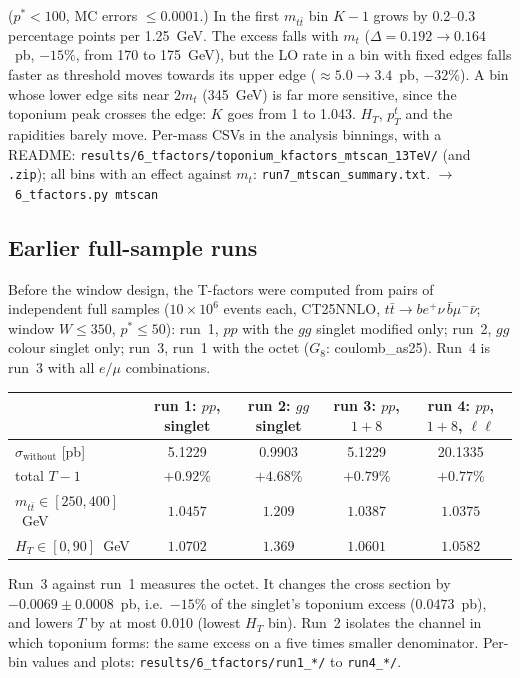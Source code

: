 \documentclass[11pt]{article}
\newcommand{\code}[1]{\texttt{#1}}
\newcommand{\fn}[1]{\hfill$\to$~\code{#1}}
\begin{document}
($p^*<100$, MC errors $\le0.0001$.) In the first $m_{t\bar t}$ bin $K-1$ grows by 0.2--0.3 percentage points per 1.25~GeV. The
excess falls with $m_t$ ($\Delta=0.192\to0.164$~pb, $-15\%$, from 170 to 175~GeV), but the LO rate in a bin with fixed edges
falls faster as threshold moves towards its upper edge ($\approx5.0\to3.4$~pb, $-32\%$). A bin whose lower edge sits near $2m_t$
(345~GeV) is far more sensitive, since the toponium peak crosses the edge: $K$ goes from 1 to 1.043. $H_T$, $p_T^t$ and the
rapidities barely move. Per-mass CSVs in the analysis binnings, with a README: \code{results/6\_tfactors/toponium\_kfactors\_mtscan\_13TeV/}
(and \code{.zip}); all bins with an effect against $m_t$: \code{run7\_mtscan\_summary.txt}. \fn{6\_tfactors.py mtscan}

\subsection{Earlier full-sample runs}
\label{sec:earlier}
Before the window design, the T-factors were computed from pairs of independent full samples ($10\times10^6$ events each, CT25NNLO,
$t\bar t\to be^+\nu\,\bar b\mu^-\bar\nu$; window $W\le350$, $p^*\le50$): run~1, $pp$ with the $gg$ singlet modified only; run~2,
$gg$ colour singlet only; run~3, run~1 with the octet ($G_8$: coulomb\_as25). Run~4 is run~3 with all $e/\mu$ combinations.

\begin{center}\small
\begin{tabular}{@{}lcccc@{}}
\toprule
 & run 1: $pp$, singlet & run 2: $gg$ singlet & run 3: $pp$, $1+8$ & run 4: $pp$, $1+8$, $\ell\ell$\\
\midrule
$\sigma_\mathrm{without}$ [pb] & 5.1229 & 0.9903 & 5.1229 & 20.1335\\
total $T-1$ & $+0.92\%$ & $+4.68\%$ & $+0.79\%$ & $+0.77\%$\\
$m_{t\bar t}\in[250,400]$~GeV & $1.0457$ & $1.209$ & $1.0387$ & $1.0375$\\
$H_T\in[0,90]$~GeV & $1.0702$ & $1.369$ & $1.0601$ & $1.0582$\\
\bottomrule
\end{tabular}
\end{center}
Run~3 against run~1 measures the octet. It changes the cross section by $-0.0069\pm0.0008$~pb, i.e.\ $-15\%$ of the singlet's toponium
excess ($0.0473$~pb), and lowers $T$ by at most 0.010 (lowest $H_T$ bin). Run~2 isolates the channel in which toponium forms: the
same excess on a five times smaller denominator. Per-bin values and plots: \code{results/6\_tfactors/run1\_*/} to \code{run4\_*/}.
\end{document}

